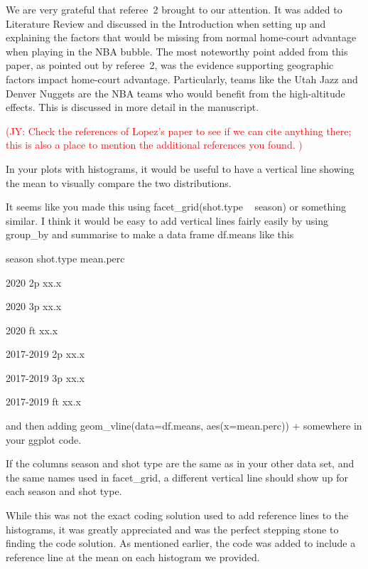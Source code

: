\documentclass[12pt]{article}
\newcommand{\jy}[1]{\textcolor{red}{(JY: #1)}}
\newenvironment{comment}%
{\begin{quoting}\noindent\small\it\ignorespaces%
  }{\end{quoting}}
\begin{document}
 We are very grateful that referee~2 brought \citet{Lopez} to our attention. 
 It was added to Literature Review and discussed in the Introduction when setting 
 up and explaining the factors that would be missing from normal home-court 
 advantage when playing in the NBA bubble. The most noteworthy point added 
 from this paper, as pointed out by referee~2, was the evidence supporting 
 geographic factors impact home-court advantage. Particularly, teams like 
 the Utah Jazz and Denver Nuggets are the NBA teams who would benefit from 
 the high-altitude effects. This is discussed in more detail in the manuscript.

 \jy{Check the references of Lopez's paper to see if we can cite
   anything there; this is also a place to mention the additional
   references you found. }

\begin{comment}
In your plots with histograms, it would be useful to have a vertical 
line showing the mean to visually compare
the two distributions.

It seems like you made this using facet\_grid(shot.type ~ season) or
something similar. I think it would be easy to add vertical lines fairly 
easily by using group\_by and summarise to make a data frame df.means
like this

season shot.type mean.perc

2020 2p xx.x

2020 3p xx.x

2020 ft xx.x

2017-2019 2p xx.x

2017-2019 3p xx.x

2017-2019 ft xx.x

and then adding
geom\_vline(data=df.means, aes(x=mean.perc)) +
somewhere in your ggplot code.

If the columns season and shot type are the same as in your other data
set, and the same names used in facet\_grid, a different vertical line
should show up for each season and shot type.
\end{comment}

 While this was not the exact coding solution used to add reference lines
 to the histograms, it was greatly appreciated and was the perfect stepping 
 stone to finding the code solution. As mentioned earlier, the code was
 added to include a reference line at the mean on each histogram we provided.
\end{document}
